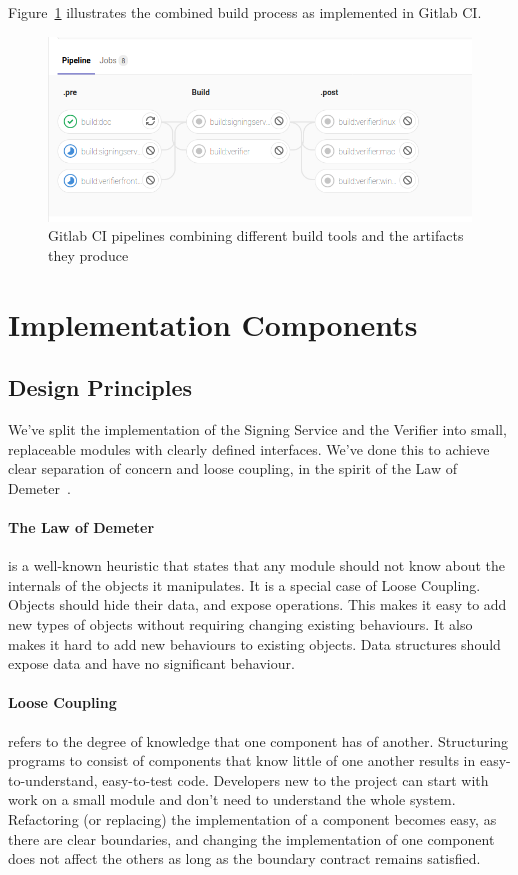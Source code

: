 Figure~\ref{fig:pipelines} illustrates the combined build process as implemented in Gitlab \gls{CI}.


\begin{figure}
    \begin{center}
        \includegraphics[width=0.7\linewidth]{images/pipelines.png}
        \caption{Gitlab CI pipelines combining different build tools and the artifacts they produce}
        \label{fig:pipelines}
    \end{center}
\end{figure}

\section{Implementation Components}\label{sec:implementation-components}
\subsection{Design Principles}\label{subsec:design-principles}
We've split the implementation of the Signing Service and the Verifier into small,
replaceable modules with clearly defined interfaces.
We've done this to achieve clear separation of concern and loose coupling,
in the spirit of the Law of Demeter~\cite{demeter}.

\paragraph{The Law of Demeter} is a well-known heuristic that states that any module should not know about the
internals of the objects it manipulates.
It is a special case of Loose Coupling.
Objects should hide their data, and expose operations.
This makes it easy to add new types of objects without requiring changing existing behaviours.
It also makes it hard to add new behaviours to existing objects.
Data structures should expose data and have no significant behaviour.

\paragraph{Loose Coupling} refers to the degree of knowledge that one component has of another.
Structuring programs to consist of components that know little of one another
results in easy-to-understand, easy-to-test code.
Developers new to the project can start with work on a small module and don't need to understand the whole system.
Refactoring (or replacing) the implementation of a component becomes easy,
as there are clear boundaries,
and changing the implementation of one component does not affect the others as long as
the boundary contract remains satisfied.


